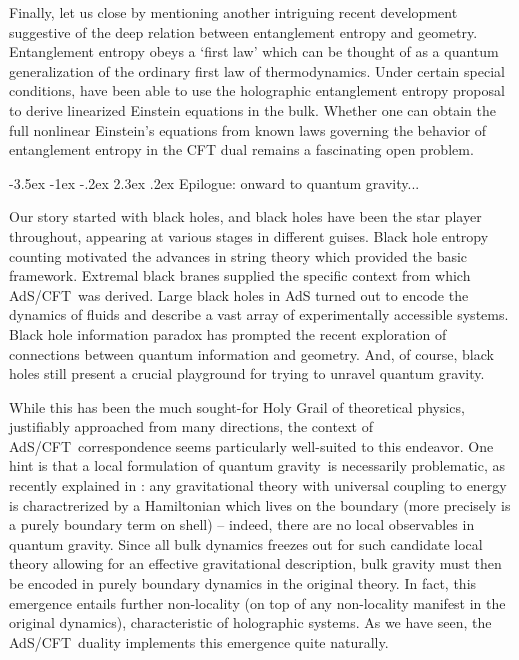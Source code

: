 \documentclass[12pt,a4paper]{article}
\makeatletter
\renewcommand\section{\@startsection {section}{1}{\z@}%
                                   {-3.5ex \@plus -1ex \@minus -.2ex}%
                                   {2.3ex \@plus.2ex}%
                                   {\normalfont\large\bfseries}}
\def\AC{AdS/CFT}
\def\QG{quantum gravity}
\makeatother
\begin{document}
Finally, let us close by mentioning another intriguing recent development suggestive of the deep relation between entanglement entropy and geometry.  
Entanglement entropy obeys a `first law' which can be thought of as a  quantum generalization of the ordinary first law of thermodynamics.
  Under certain special conditions,  \cite{Faulkner:2013ica} have been able to use the holographic entanglement entropy proposal to derive   linearized Einstein equations in the bulk.  Whether one can obtain the full nonlinear Einstein's equations from known laws governing the behavior of entanglement entropy in the CFT dual remains a fascinating open problem.



\section{Epilogue: onward to quantum gravity...}
\label{s:concl}

Our story started with black holes, and black holes have been the star player throughout, appearing at various stages in different guises.  
Black hole entropy counting motivated the advances in string theory which provided the basic framework.  Extremal black branes supplied the specific context from which \AC\ was derived.  Large black holes in AdS turned out to encode the dynamics of fluids and describe a vast array of experimentally accessible systems.  Black hole information paradox has prompted the recent exploration of connections between quantum information and geometry.  
And, of course, black holes still present a crucial playground for trying to unravel \QG.

While this has been the much sought-for Holy Grail of theoretical physics, justifiably approached from many directions, the context of \AC\ correspondence seems particularly well-suited to this endeavor.  One hint is that a local formulation of \QG\ is necessarily problematic, as recently explained in \cite{Marolf:2014yga}: any gravitational theory with universal coupling to energy is charactrerized by a Hamiltonian which lives on the boundary (more precisely is a purely boundary term on shell) -- indeed, there are no local observables in quantum gravity. 
Since all bulk dynamics freezes out for such candidate local theory allowing for an effective gravitational description,  bulk gravity must then be encoded in purely boundary dynamics in the original theory.  In fact, this emergence entails further non-locality (on top of any non-locality manifest in the original dynamics), characteristic of holographic systems.  As we have seen, the \AC\ duality implements this emergence quite naturally.
\end{document}

